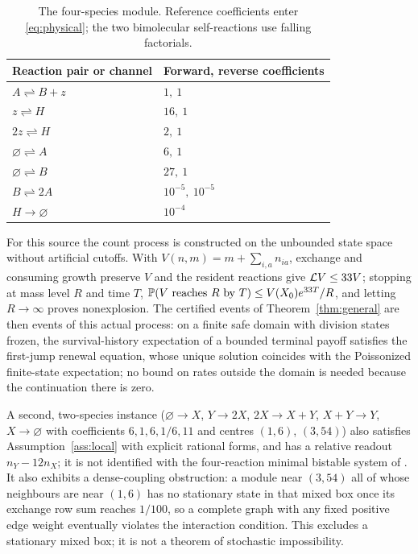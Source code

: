 \begin{table}[t]
\centering
\caption{The four-species module. Reference coefficients enter \eqref{eq:physical}; the two bimolecular self-reactions use falling factorials.}\label{tab:fourspecies}
\begin{tabular}{@{}ll@{}}\toprule
Reaction pair or channel & Forward, reverse coefficients\\\midrule
$A\rightleftharpoons B+z$ & $1,\ 1$\\
$z\rightleftharpoons H$ & $16,\ 1$\\
$2z\rightleftharpoons H$ & $2,\ 1$\\
$\varnothing\rightleftharpoons A$ & $6,\ 1$\\
$\varnothing\rightleftharpoons B$ & $27,\ 1$\\
$B\rightleftharpoons2A$ & $10^{-5},\ 10^{-5}$\\
$H\to\varnothing$ & $10^{-4}$\\\bottomrule
\end{tabular}
\end{table}

For this source the count process is constructed on the unbounded state space without artificial cutoffs. With $V(n,m)=m+\sum_{i,a}n_{ia}$, exchange and consuming growth preserve $V$ and the resident reactions give $\mathcal L V\le33V$; stopping at mass level $R$ and time $T$, $\mathbb P(V\text{ reaches }R\text{ by }T)\le V(X_0)e^{33T}/R$, and letting $R\to\infty$ proves nonexplosion. The certified events of Theorem~\ref{thm:general} are then events of this actual process: on a finite safe domain with division states frozen, the survival-history expectation of a bounded terminal payoff satisfies the first-jump renewal equation, whose unique solution coincides with the Poissonized finite-state expectation; no bound on rates outside the domain is needed because the continuation there is zero.

A second, two-species instance ($\varnothing\to X$, $Y\to2X$, $2X\to X+Y$, $X+Y\to Y$, $X\to\varnothing$ with coefficients $6,1,6,1/6,11$ and centres $(1,6)$, $(3,54)$) also satisfies Assumption~\ref{ass:local} with explicit rational forms, and has a relative readout $n_Y-12n_X$; it is not identified with the four-reaction minimal bistable system of \citet{wilhelm2009}. It also exhibits a dense-coupling obstruction: a module near $(3,54)$ all of whose neighbours are near $(1,6)$ has no stationary state in that mixed box once its exchange row sum reaches $1/100$, so a complete graph with any fixed positive edge weight eventually violates the interaction condition. This excludes a stationary mixed box; it is not a theorem of stochastic impossibility.

